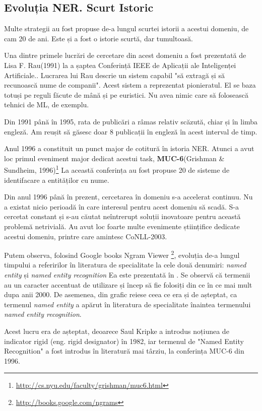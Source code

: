 \subsection{Evoluția NER. Scurt Istoric}

Multe strategii au fost propuse de-a lungul scurtei istorii a acestui domeniu, de cam 20 de ani. Este și a fost o istorie scurtă, dar tumultoasă.

Una dintre primele lucrări de cercetare din acest domeniu a fost prezentată de Lisa F. Rau(1991) la a șaptea Conferință IEEE de Aplicații ale Inteligenței Artificiale.\cite{rau1991}. Lucrarea lui Rau descrie un sistem capabil "să extragă și să recunoască nume de companii". Acest sistem a reprezentat pionieratul. El se baza totuși pe reguli făcute de mână și pe euristici. Nu avea nimic care să folosească tehnici de ML, de exemplu.

Din 1991 până în 1995, rata de publicări a râmas relativ scăzută, chiar și în limba engleză. Am reușit să găsesc doar 8 publicații în engleză în acest interval de timp.

Anul 1996 a constituit un punct major de cotitură în istoria NER. Atunci a avut loc primul eveniment major dedicat acestui task, \textbf{MUC-6}(Grishman \& Sundheim, 1996)\footnote{\url{http://cs.nyu.edu/faculty/grishman/muc6.html}}\cite{grishman1996} La această conferința au fost propuse 20 de sisteme de identifacare a entităților cu nume.

Din anul 1996 până în prezent, cercetarea în domeniu s-a accelerat continuu. Nu a existat nicio perioadă în care interesul pentru acest domeniu să scadă. S-a cercetat constant și s-au căutat neîntrerupt soluții inovatoare pentru această problemă netrivială. Au avut loc foarte multe evenimente științifice dedicate acestui domeniu, printre care amintesc CoNLL-2003.\cite{conll2003}

Putem observa, folosind Google books Ngram Viewer \footnote{\url{http://books.google.com/ngrams}}, evoluția de-a lungul timpului a referirilor în literatura de specialitate la cele două denumiri: \textit{named entity} și \textit{named entity recognition} Ea este prezentată în . Se observă că termenii au un caracter accentuat de utilizare și încep să fie folosiți din ce în ce mai mult dupa anii 2000. De asemenea, din grafic reiese ceea ce era și de așteptat, ca termenul \textit{named entity} a apărut în literatura de specialitate înaintea termenului \textit{named entity recognition}.

Acest lucru era de așteptat, deoarece Saul Kripke a introdus noțiunea de indicator rigid (eng. rigid designator) în 1982, iar termenul de "Named Entity Recognition" a fost introdus în literatură mai târziu, la conferința MUC-6 din 1996.\cite{grishman1996}

